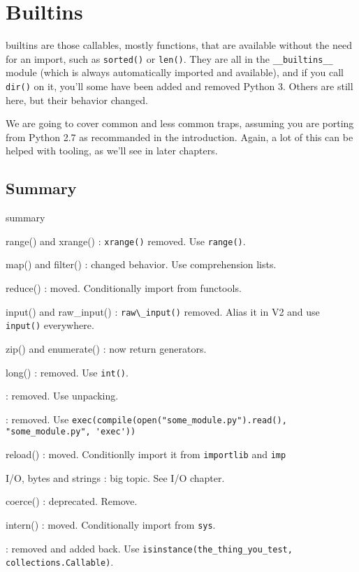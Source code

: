 
\chapter{Builtins}

\Glspl{builtin} are those \glspl{callable}, mostly functions, that are available without the need for an import, such as \lstinline{sorted()} or \lstinline{len()}. They are all in the \lstinline{__builtins__} module (which is always automatically imported and available), and if you call \lstinline{dir()} on it, you'll some have been added and removed Python 3. Others are still here, but their behavior changed.

We are going to cover common and less common traps, assuming you are porting from Python 2.7 as recommanded in the introduction. Again, a lot of this can be helped with tooling, as we'll see in later chapters.

\section{Summary}

\begin{labeling}{summary}
\item [range() and xrange()]: \lstinline{xrange()} removed. Use \lstinline{range()}.
\item [map() and filter()]: changed behavior. Use comprehension lists.
\item [reduce()]: moved. Conditionally import from functools.
\item [input() and raw\_input()]: \lstinline{raw\_input()} removed. Alias it in V2 and use \lstinline{input()} everywhere.
\item [zip() and enumerate()]: now return generators.
\item [long()]: removed. Use \lstinline{int()}.
\item [apply()]: removed. Use unpacking.
\item [execfile()]: removed. Use \lstinline{exec(compile(open("some_module.py").read(), "some_module.py", 'exec'))}
\item [reload()]: moved. Conditionlly import it from \lstinline{importlib} and \lstinline{imp}
\item [I/O, bytes and strings]: big topic. See I/O chapter.
\item [coerce()]: deprecated. Remove.
\item [intern()]: moved. Conditionally import from \lstinline{sys}.
\item [callable()]: removed and added back. Use \lstinline{isinstance(the_thing_you_test, collections.Callable)}.
\end{labeling}

